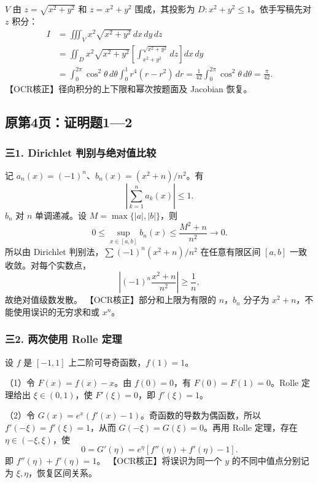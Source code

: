 \documentclass[11pt,fontset=fandol]{ctexart}
\begin{document}
\(V\) 由 \(z=\sqrt{x^2+y^2}\) 和 \(z=x^2+y^2\) 围成，其投影为
\(D:x^2+y^2\le1\)。依手写稿先对 \(z\) 积分： \[
\begin{aligned}
I&=\iiint_Vx^2\sqrt{x^2+y^2}\,dx\,dy\,dz\\
&=\iint_Dx^2\sqrt{x^2+y^2}
\left[\int_{x^2+y^2}^{\sqrt{x^2+y^2}}dz\right]dx\,dy\\
&=\int_0^{2\pi}\cos^2\theta\,d\theta\int_0^1r^4(r-r^2)\,dr
=\frac1{42}\int_0^{2\pi}\cos^2\theta\,d\theta=\frac\pi{42}.
\end{aligned}
\] 【OCR核正】径向积分的上下限和幂次按题面及 Jacobian 恢复。

\subsection{原第4页：证明题1---2}\label{ux539fux7b2c4ux9875ux8bc1ux660eux989812}

\subsubsection{三1. Dirichlet
判别与绝对值比较}\label{ux4e091.-dirichlet-ux5224ux522bux4e0eux7eddux5bf9ux503cux6bd4ux8f83}

记 \(a_n(x)=(-1)^n\)、\(b_n(x)=(x^2+n)/n^2\)。有 \[
\left|\sum_{k=1}^na_k(x)\right|\le1.
\] \(b_n\) 对 \(n\) 单调递减。设 \(M=\max\{|a|,|b|\}\)，则 \[
0\le\sup_{x\in[a,b]}b_n(x)\le\frac{M^2+n}{n^2}\to0.
\] 所以由 Dirichlet 判别法，\(\sum(-1)^n(x^2+n)/n^2\) 在任意有限区间
\([a,b]\) 一致收敛。对每个实数点， \[
\left|(-1)^n\frac{x^2+n}{n^2}\right|\ge\frac1n,
\] 故绝对值级数发散。 【OCR核正】部分和上限为有限的 \(n\)，\(b_n\)
分子为 \(x^2+n\)，不能使用误识的无穷求和或 \(x^n\)。

\subsubsection{三2. 两次使用 Rolle
定理}\label{ux4e092.-ux4e24ux6b21ux4f7fux7528-rolle-ux5b9aux7406}

设 \(f\) 是 \([-1,1]\) 上二阶可导奇函数，\(f(1)=1\)。

（1）令 \(F(x)=f(x)-x\)。由 \(f(0)=0\)，有 \(F(0)=F(1)=0\)。Rolle
定理给出 \(\xi\in(0,1)\)，使 \(F'(\xi)=0\)，即 \(f'(\xi)=1\)。

（2）令 \(G(x)=e^x(f'(x)-1)\)。奇函数的导数为偶函数，所以
\(f'(-\xi)=f'(\xi)=1\)，从而 \(G(-\xi)=G(\xi)=0\)。再用 Rolle 定理，存在
\(\eta\in(-\xi,\xi)\)，使 \[
0=G'(\eta)=e^\eta[f''(\eta)+f'(\eta)-1].
\] 即 \(f''(\eta)+f'(\eta)=1\)。 【OCR核正】将误识为同一个 \(y\)
的不同中值点分别记为 \(\xi,\eta\)，恢复区间关系。
\end{document}
